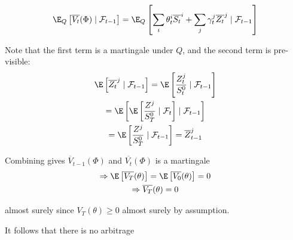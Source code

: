 \begin{prf}[]{}
\begin{equation*}
    \begin{gathered}
      \E_Q\left[\overline{V_t}(\Phi)\mid\mathcal{F}_{t-1}\right] = \E_Q\left[\sum_{i}\theta_t^i\overline{S_t}^i+\sum_{j}\gamma_t^j\overline{Z_t}^j\mid\mathcal{F}_{t-1}\right]
    \end{gathered}
  \end{equation*}\par
  \noindent Note that the first term is a martingale under $Q$, and the second term is pre-visible:
  \begin{equation*}
    \begin{gathered}
      \E\left[\overline{Z_t}^j\mid\mathcal{F}_{t-1}\right] = \E\left[\dfrac{Z_t^j}{S_t^0}\mid\mathcal{F}_{t-1}\right]\\
      = \E\left[\E\left[\dfrac{Z^j}{S_T^0}\mid\mathcal{F}_t\right]\mid\mathcal{F}_{t-1}\right]\\
      = \E\left[\dfrac{Z^j}{S_T^0}\mid\mathcal{F}_{t-1}\right] = \overline{Z}_{t-1}^j
    \end{gathered}
  \end{equation*}\par
  \noindent Combining gives $\overline{V}_{t-1}(\Phi)$ and $\overline{V_t}(\Phi)$ is a martingale
  \begin{equation*}
    \begin{gathered}
      \Rightarrow \E\left[\overline{V_T}(\theta)\right] = \E\left[\overline{V_0}(\theta)\right] = 0\\
      \Rightarrow \overline{V_T}(\theta) = 0
    \end{gathered}
  \end{equation*}\par
  \noindent almost surely since $V_T(\theta)\geq0$ almost surely by assumption.\par
  \noindent It follows that there is no arbitrage
\end{prf}
\par\bigskip
